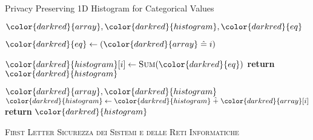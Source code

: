 \begin{algorithm}[H]
\caption{Privacy Preserving 1D Histogram for Categorical Values}\label{a:1d-histogram-categorical}
\begin{algorithmic}[1]
\renewcommand{\algorithmicrequire}{\textbf{Private Vars:}}
\Require ${\color{darkred}{array}}, {\color{darkred}{histogram}}, {\color{darkred}{eq}}$

        \State ${\color{darkred}{eq}} \gets ({\color{darkred}{array}} \heq i)$

        \State ${\color{darkred}{histogram}}[i] \gets
        \textsc{Sum}({\color{darkred}{eq}})$
    \EndFor
    \State \textbf{return} {${\color{darkred}{histogram}}$}
\EndProcedure

\begin{spacing}{0.5}
\end{spacing}

\Require ${\color{darkred}{array}}, {\color{darkred}{histogram}}$
        \State ${\color{darkred}{histogram}} \gets {\color{darkred}{histogram}} \hplus{\color{darkred}{array}}[i]$
    \EndFor
    \State \textbf{return} {${\color{darkred}{histogram}}$}
\EndProcedure

\end{algorithmic}
\end{algorithm}


{ \scshape First Letter}
\textsc{Sicurezza dei Sistemi e delle  Reti Informatiche}



